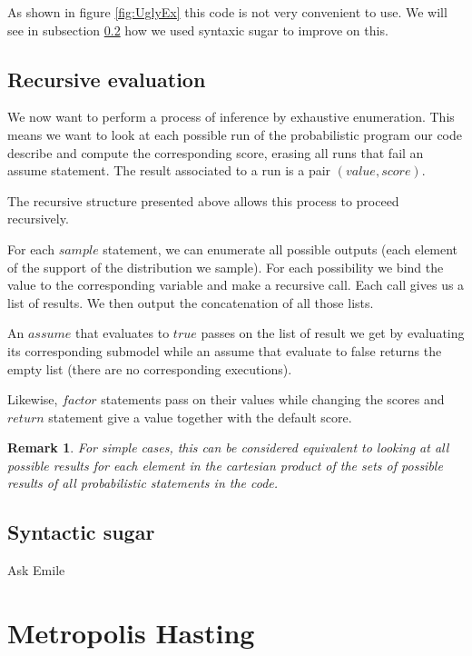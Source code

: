 \documentclass{article}
\newcommand\SC[1]{{\color{violet}{\it \bf Simon :} #1}}
\newtheorem{remark}{Remark}
\begin{document}
	As shown in figure \ref{fig:UglyEx} this code is not very convenient to use. We will see in subsection \ref{subseq:sugar} how we used syntaxic sugar to improve on this.

	\subsection{Recursive evaluation}

	We now want to perform a process of inference by exhaustive enumeration.
	This means we want to look at each possible run of the probabilistic program our code describe and compute the corresponding score, erasing all runs that fail an assume statement.
	The result associated to a run is a pair $(value, score)$.

	The recursive structure presented above allows this process to proceed recursively.

	For each $sample$ statement, we can enumerate all possible outputs (each element of the support of the distribution we sample). For each possibility we bind the value to the corresponding variable and make a recursive call.
	Each call gives us a list of results. We then output the concatenation of all those lists.

	An $assume$ that evaluates to $true$ passes on the list of result we get by evaluating its corresponding submodel while an assume that evaluate to false returns the empty list (there are no corresponding executions).

	Likewise, $factor$ statements pass on their values while changing the scores and $return$ statement give a value together with the default score.

	\begin{remark}
	  For simple cases, this can be considered equivalent to looking at all possible results for each element in the cartesian product of the sets of possible results of all probabilistic statements in the code.
	\end{remark}

	\subsection{Syntactic sugar}
	\label{subseq:sugar}

	\SC{Ask Emile}

\section{Metropolis Hasting}
\end{document}
